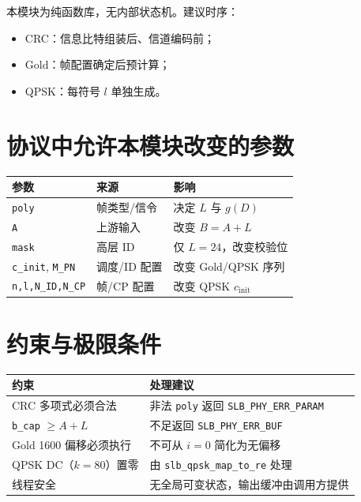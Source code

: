\documentclass[11pt,a4paper]{ctexart}
\begin{document}
本模块为纯函数库，无内部状态机。建议时序：
\begin{itemize}[nosep]
  \item CRC：信息比特组装后、信道编码前；
  \item Gold：帧配置确定后预计算；
  \item QPSK：每符号 $l$ 单独生成。
\end{itemize}

\section{协议中允许本模块改变的参数}

\begin{table}[h]
\centering
\small
\begin{tabular}{lll}
\toprule
\textbf{参数} & \textbf{来源} & \textbf{影响} \\
\midrule
\texttt{poly} & 帧类型/信令 & 决定 $L$ 与 $g(D)$ \\
\texttt{A} & 上游输入 & 改变 $B{=}A{+}L$ \\
\texttt{mask} & 高层 ID & 仅 $L{=}24$，改变校验位 \\
\texttt{c\_init}, \texttt{M\_PN} & 调度/ID 配置 & 改变 Gold/QPSK 序列 \\
\texttt{n,l,N\_ID,N\_CP} & 帧/CP 配置 & 改变 QPSK $c_{\mathrm{init}}$ \\
\bottomrule
\end{tabular}
\end{table}

\section{约束与极限条件}

\begin{table}[h]
\centering
\small
\begin{tabular}{p{4.5cm}p{9.5cm}}
\toprule
\textbf{约束} & \textbf{处理建议} \\
\midrule
CRC 多项式必须合法 & 非法 \texttt{poly} 返回 \texttt{SLB\_PHY\_ERR\_PARAM} \\
\texttt{b\_cap} $\geq A{+}L$ & 不足返回 \texttt{SLB\_PHY\_ERR\_BUF} \\
Gold 1600 偏移必须执行 & 不可从 $i{=}0$ 简化为无偏移 \\
QPSK DC（$k{=}80$）置零 & 由 \texttt{slb\_qpsk\_map\_to\_re} 处理 \\
线程安全 & 无全局可变状态，输出缓冲由调用方提供 \\
\bottomrule
\end{tabular}
\end{table}
\end{document}
